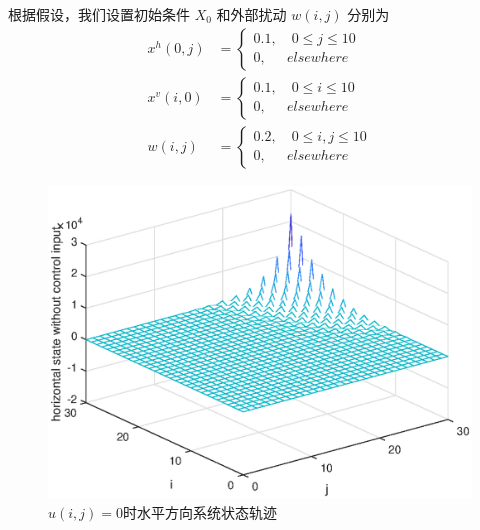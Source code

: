 	根据假设，我们设置初始条件 $X_{0}$ 和外部扰动 $w(i,j)$ 分别为
	\begin{equation*}
	\begin{aligned}
	x^{h}(0, j)&=\begin{cases}
	0.1, \quad 0\leq j \leq 10 \\
	0, \quad \ \ elsewhere
	\end{cases} \\
	x^{v}(i, 0)&=\begin{cases}
	0.1, \quad 0\leq i \leq 10 \\
	0, \quad \ \ elsewhere
	\end{cases}\\
	w(i, j)\ &=\begin{cases}
	0.2, \quad 0\leq i,j \leq 10 \\
	0, \quad \ \ elsewhere
	\end{cases}
	\end{aligned}
	\end{equation*}
	\begin{figure}[!htb]
		\centering\includegraphics[scale=0.6]{./figures/2dsmc/simulations/hx-no-controll-input.eps}
		\caption{  $u(i,j)=0$时水平方向系统状态轨迹}
		\label{fig3}
	\end{figure}
